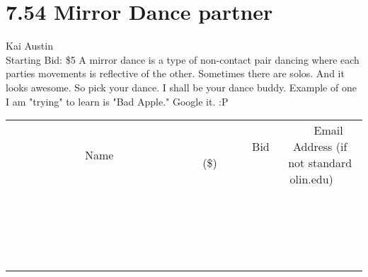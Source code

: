 \documentclass[11pt]{article}
\begin{document}
\section*{7.54 Mirror Dance partner}
Kai Austin
\\
Starting Bid: \$5
\newline
A mirror dance is a type of non-contact pair dancing where each parties movements is reflective of the other. Sometimes there are solos. And it looks awesome. So pick your dance. I shall be your dance buddy.
Example of one I am "trying" to learn is "Bad Apple." Google it. :P
\\[3ex]
\begin{tabular}{c c c}
~~~~~~~~~~~~~Name~~~~~~~~~~~~~ & ~~~~~~~~~Bid (\$)~~~~~~~~~  & ~~~Email Address (if not standard olin.edu)~~~\\
 & & \\
\hline
 & & \\
\hline
 & & \\
\hline
 & & \\
\hline
 & & \\
\hline
 & & \\
\hline
 & & \\
\hline
 & & \\
\hline
 & & \\
\hline
 & & \\
\hline
 & & \\
\hline
 & & \\
\hline
 & & \\
\hline
 & & \\
\hline
 & & \\
\hline
 & & \\
\hline
 & & \\
\hline
 & & \\
\hline
 & & \\
\hline
\end{tabular}
\newpage
\end{document}
